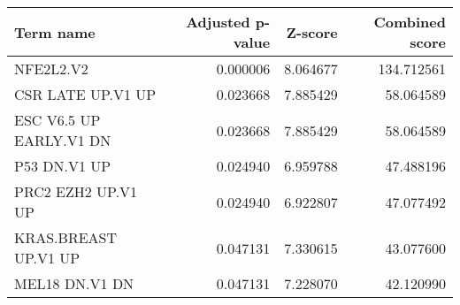 \begin{tabular}{lrrr}
\toprule
              Term name &  Adjusted p-value &  Z-score &  Combined score \\
\midrule
              NFE2L2.V2 &          0.000006 & 8.064677 &      134.712561 \\
      CSR LATE UP.V1 UP &          0.023668 & 7.885429 &       58.064589 \\
ESC V6.5 UP EARLY.V1 DN &          0.023668 & 7.885429 &       58.064589 \\
           P53 DN.V1 UP &          0.024940 & 6.959788 &       47.488196 \\
     PRC2 EZH2 UP.V1 UP &          0.024940 & 6.922807 &       47.077492 \\
   KRAS.BREAST UP.V1 UP &          0.047131 & 7.330615 &       43.077600 \\
         MEL18 DN.V1 DN &          0.047131 & 7.228070 &       42.120990 \\
\bottomrule
\end{tabular}
